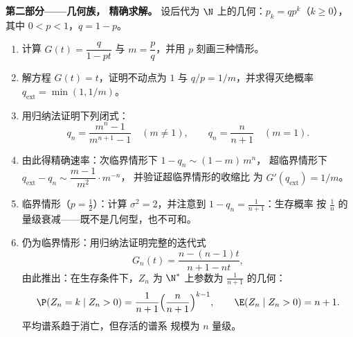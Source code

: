 \begin{problem}
\medskip
\noindent\textbf{第二部分——几何族，
精确求解。} 设后代为 $\N$ 上的几何：$p_k =
qp^k$（$k \geq 0$），其中 $0 < p < 1$，$q = 1 - p$。
\begin{enumerate}[resume]
  \item 计算 $G(t) = \dfrac{q}{1 - pt}$ 与 $m = \dfrac
        pq$，并用 $p$ 刻画三种情形。
  \item 解方程 $G(t) = t$，证明不动点为 $1$ 与
        $q/p = 1/m$，并求得灭绝概率
        $q_{\mathrm{ext}} = \min(1, 1/m)$。
  \item 用归纳法证明下列闭式：
        \[
        q_n = \frac{m^n - 1}{m^{n+1} - 1} \quad (m \neq 1),
        \qquad
        q_n = \frac{n}{n+1} \quad (m = 1).
        \]
  \item 由此得精确速率：次临界情形下 $1 - q_n \sim (1 - m)\,m^n$，
        超临界情形下 $q_{\mathrm{ext}} - q_n
        \sim \dfrac{m - 1}{m^{2}}\cdot m^{-n}$，
        并验证超临界情形的收缩比
        为 $G'(q_{\mathrm{ext}}) = 1/m$。
  \item 临界情形（$p = \tfrac12$）：计算 $\sigma^2 =
        2$，并注意到 $1 - q_n = \frac1{n+1}$：生存概率
        按 $\frac1n$ 的量级衰减——既不是几何型，也不可和。
  \item 仍为临界情形：用归纳法证明完整的迭代式
        \[
        G_n(t) = \frac{n - (n-1)t}{n + 1 - nt},
        \]
        由此推出：在生存条件下，$Z_n$ 为
        $\N^*$ 上参数为 $\frac1{n+1}$ 的几何：
        \[
        \P(Z_n = k \mid Z_n > 0) = \frac1{n+1}
        \Bigl(\frac{n}{n+1}\Bigr)^{k-1},
        \qquad
        \E(Z_n \mid Z_n > 0) = n + 1 .
        \]
        平均谱系趋于消亡，但存活的谱系
        规模为 $n$ 量级。
\end{enumerate}


\end{problem}
